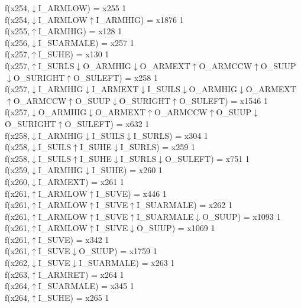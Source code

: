 f(x254,$\downarrow$I\_ARMLOW) = x255 {1} \\
f(x254,$\downarrow$I\_ARMLOW$\uparrow$I\_ARMHIG) = x1876 {1} \\
f(x255,$\uparrow$I\_ARMHIG) = x128 {1} \\
f(x256,$\downarrow$I\_SUARMALE) = x257 {1} \\
f(x257,$\uparrow$I\_SUHE) = x130 {1} \\
f(x257,$\uparrow$I\_SURLS$\downarrow$O\_ARMHIG$\downarrow$O\_ARMEXT$\uparrow$O\_ARMCCW$\uparrow$O\_SUUP$\downarrow$O\_SURIGHT$\uparrow$O\_SULEFT) = x258 {1} \\
f(x257,$\downarrow$I\_ARMHIG$\downarrow$I\_ARMEXT$\downarrow$I\_SUILS$\downarrow$O\_ARMHIG$\downarrow$O\_ARMEXT$\uparrow$O\_ARMCCW$\uparrow$O\_SUUP$\downarrow$O\_SURIGHT$\uparrow$O\_SULEFT) = x1546 {1} \\
f(x257,$\downarrow$O\_ARMHIG$\downarrow$O\_ARMEXT$\uparrow$O\_ARMCCW$\uparrow$O\_SUUP$\downarrow$O\_SURIGHT$\uparrow$O\_SULEFT) = x632 {1} \\
f(x258,$\downarrow$I\_ARMHIG$\downarrow$I\_SUILS$\downarrow$I\_SURLS) = x304 {1} \\
f(x258,$\downarrow$I\_SUILS$\uparrow$I\_SUHE$\downarrow$I\_SURLS) = x259 {1} \\
f(x258,$\downarrow$I\_SUILS$\uparrow$I\_SUHE$\downarrow$I\_SURLS$\downarrow$O\_SULEFT) = x751 {1} \\
f(x259,$\downarrow$I\_ARMHIG$\downarrow$I\_SUHE) = x260 {1} \\
f(x260,$\downarrow$I\_ARMEXT) = x261 {1} \\
f(x261,$\uparrow$I\_ARMLOW$\uparrow$I\_SUVE) = x446 {1} \\
f(x261,$\uparrow$I\_ARMLOW$\uparrow$I\_SUVE$\uparrow$I\_SUARMALE) = x262 {1} \\
f(x261,$\uparrow$I\_ARMLOW$\uparrow$I\_SUVE$\uparrow$I\_SUARMALE$\downarrow$O\_SUUP) = x1093 {1} \\
f(x261,$\uparrow$I\_ARMLOW$\uparrow$I\_SUVE$\downarrow$O\_SUUP) = x1069 {1} \\
f(x261,$\uparrow$I\_SUVE) = x342 {1} \\
f(x261,$\uparrow$I\_SUVE$\downarrow$O\_SUUP) = x1759 {1} \\
f(x262,$\downarrow$I\_SUVE$\downarrow$I\_SUARMALE) = x263 {1} \\
f(x263,$\uparrow$I\_ARMRET) = x264 {1} \\
f(x264,$\uparrow$I\_SUARMALE) = x345 {1} \\
f(x264,$\uparrow$I\_SUHE) = x265 {1} \\
